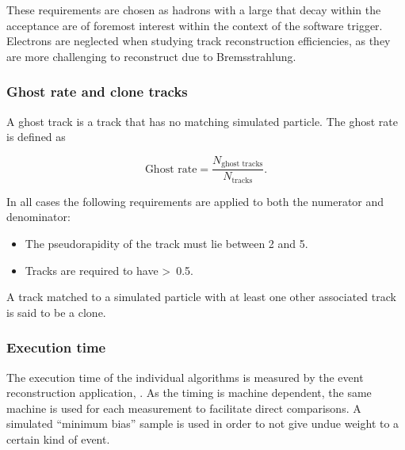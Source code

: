 \noindent These requirements are chosen as \bquark hadrons with a large \pt that decay within the \lhcb acceptance are of foremost interest within the context of the \lhcb software trigger. Electrons are neglected when studying track reconstruction efficiencies, as they are more challenging to reconstruct due to Bremsstrahlung.

\subsubsection{Ghost rate and clone tracks}
\label{sec:track:gr}
A ghost track is a track that has no matching simulated particle. The ghost rate is defined as

\begin{equation}
\text{Ghost rate}  = \frac{N_{\text{ghost~tracks}}}{N_{\text{tracks}}}.
\end{equation}

\noindent In all cases the following requirements are applied to both the numerator and denominator:

\begin{itemize}
\item The pseudorapidity of the track must lie between 2 and 5.
\item Tracks are required to have \pt\textgreater~0.5\gevc.
\end{itemize}

A track matched to a simulated particle with at least one other associated track is said to be a clone.

\subsubsection{Execution time}
\label{sec:track:timing}

The execution time of the individual algorithms is measured by the \lhcb event reconstruction application, \brunel. As the timing is machine dependent, the same machine is used for each measurement to facilitate direct comparisons. A simulated ``minimum bias'' sample is used in order to not give undue weight to a certain kind of event.

